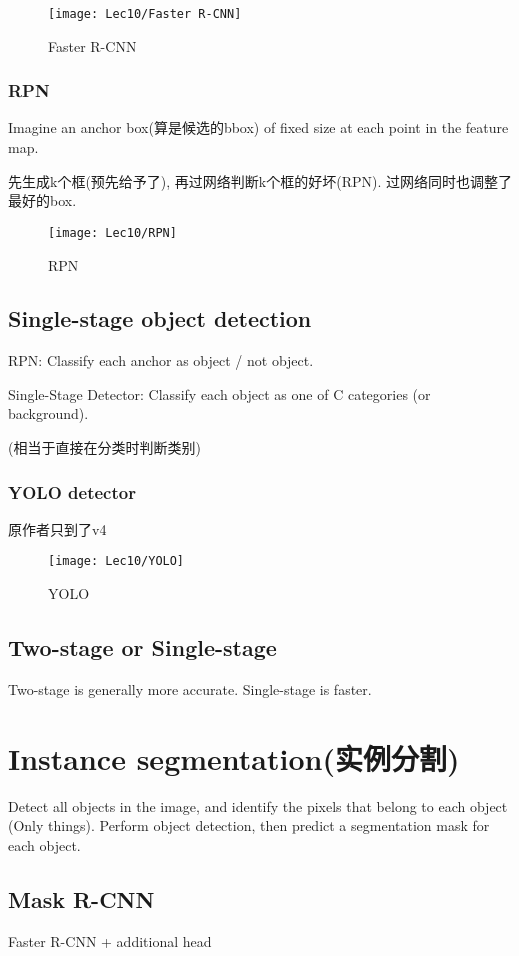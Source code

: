 \begin{figure}[H]
    \centering
    \texttt{[image: Lec10/Faster R-CNN]}
    \caption{Faster R-CNN}
\end{figure}

\subsubsection{RPN}
Imagine an anchor box(算是候选的bbox) of fixed size at each point in the feature map. 

先生成k个框(预先给予了), 再过网络判断k个框的好坏(RPN). 过网络同时也调整了最好的box. 

\begin{figure}[H]
    \centering
    \texttt{[image: Lec10/RPN]}
    \caption{RPN}
\end{figure}

\subsection{Single-stage object detection}
RPN: Classify each anchor as object / not object.

Single-Stage Detector: Classify each object as one of C categories (or background).

(相当于直接在分类时判断类别)

\subsubsection{YOLO detector}
原作者只到了v4
\begin{figure}[H]
    \centering
    \texttt{[image: Lec10/YOLO]}
    \caption{YOLO}
\end{figure}

\subsection{Two-stage or Single-stage}
Two-stage is generally more accurate. Single-stage is faster. 

\section{Instance segmentation(实例分割)}
Detect all objects in the image, and identify the pixels that belong to each object (Only things). Perform object detection, then predict a segmentation mask for each object.

\subsection{Mask R-CNN}
Faster R-CNN + additional head

